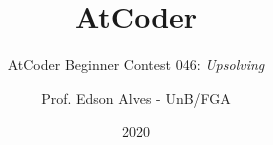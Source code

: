 \title{AtCoder}
\subtitle{AtCoder Beginner Contest 046: {\it Upsolving}}
\author{Prof. Edson Alves - UnB/FGA}
\date{2020}

